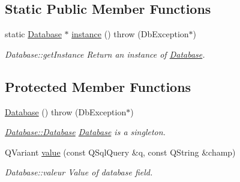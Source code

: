 \subsection*{Static Public Member Functions}
\begin{DoxyCompactItemize}
\item 
static \hyperlink{classDatabase_1_1Database}{Database} $\ast$ \hyperlink{classDatabase_1_1Database_a90cc546ea663945d6878c4babf10a9f4}{instance} ()  throw (\+Db\+Exception$\ast$)
\begin{DoxyCompactList}\small\item\em Database\+::get\+Instance Return an instance of \hyperlink{classDatabase_1_1Database}{Database}. \end{DoxyCompactList}\end{DoxyCompactItemize}
\subsection*{Protected Member Functions}
\begin{DoxyCompactItemize}
\item 
\hypertarget{classDatabase_1_1Database_a7c8f22f12dd131087a37f0b8222a3f63}{\hyperlink{classDatabase_1_1Database_a7c8f22f12dd131087a37f0b8222a3f63}{Database} ()  throw (\+Db\+Exception$\ast$)}\label{classDatabase_1_1Database_a7c8f22f12dd131087a37f0b8222a3f63}

\begin{DoxyCompactList}\small\item\em \hyperlink{classDatabase_1_1Database}{Database\+::\+Database} \hyperlink{classDatabase_1_1Database}{Database} is a singleton. \end{DoxyCompactList}\item 
Q\+Variant \hyperlink{classDatabase_1_1Database_aeddc953300288d633881cf9bb6a4264e}{value} (const Q\+Sql\+Query \&q, const Q\+String \&champ)
\begin{DoxyCompactList}\small\item\em Database\+::valeur Value of database field. \end{DoxyCompactList}\end{DoxyCompactItemize}
